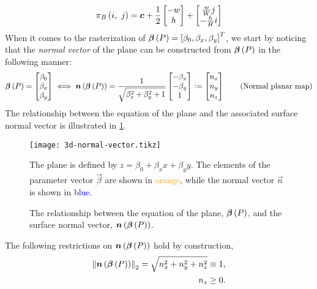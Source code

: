 \begin{equation*}
  \pi_{B}\left(i,~j\right)
  =
  \boldsymbol{c}
  +
  \frac{1}{2} \begin{bmatrix}
    -w\\
    h
  \end{bmatrix}
  +
  \begin{bmatrix}
    \frac{w}{W} j\\
    -\frac{h}{H} i\\
  \end{bmatrix}
\end{equation*}
When it comes to the rasterization of $\boldsymbol{\beta}\left(P\right) = {[\beta_0, \beta_x, \beta_y]}^T$, we start by noticing that the \textit{normal vector} of the plane can be constructed from $\boldsymbol{\beta}\left(P\right)$ in the following manner:
\begin{equation*}
  \boldsymbol{\beta}\left(P\right)
  =
  \begin{bmatrix}
    \beta_0\\
    \beta_x\\
    \beta_y\\
  \end{bmatrix}
  \iff
  \boldsymbol{n}\left(\boldsymbol{\beta}\left(P\right)\right)
  =
  \frac{1}{\sqrt{\beta_x^2 + \beta_y^2 + 1}}
  \begin{bmatrix}
    -\beta_x\\
    -\beta_y\\
    1
  \end{bmatrix}
  \vcentcolon=
  \begin{bmatrix}
    n_x\\
    n_y\\
    n_z
  \end{bmatrix}
  \tag{Normal planar map}\label{eq:normalplanar}
\end{equation*}
The relationship between the equation of the plane and the associated surface normal vector is illustrated in \cref{fig:3d-normal-vector}.
\begin{figure}[H]
  \centering
  \texttt{[image: 3d-normal-vector.tikz]}
  \caption{%
    The relationship between the equation of the plane, $\boldsymbol{\beta}\left(P\right)$, and the surface normal vector, $\boldsymbol{n}\left(\boldsymbol{\beta}\left(P\right)\right)$.
  }{%
    The plane is defined by $z = \beta_0 + \beta_x x + \beta_y y$.
    The elements of the parameter vector $\vec{\beta}$ are shown in \textcolor{orange}{orange}, while the normal vector $\vec{n}$ is shown in \textcolor{blue}{blue}.
  }%
  \label{fig:3d-normal-vector}
\end{figure}
\noindent
The following restrictions on $\boldsymbol{n}\left(\boldsymbol{\beta}\left(P\right)\right)$ hold by construction,
\begin{align*}
  \left\lVert\boldsymbol{n}\left(\boldsymbol{\beta}\left(P\right)\right)\right\rVert_2 = \sqrt{n_x^2 + n_y^2 + n_z^2} &\equiv 1,
  \\
  n_z &\geq 0.
\end{align*}
